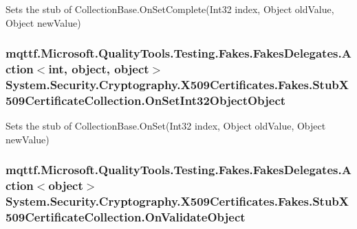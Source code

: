 Sets the stub of Collection\-Base.\-On\-Set\-Complete(\-Int32 index, Object old\-Value, Object new\-Value)

\hypertarget{class_system_1_1_security_1_1_cryptography_1_1_x509_certificates_1_1_fakes_1_1_stub_x509_certificate_collection_a7a2b38e975f09ab9f6a3968e4dedb807}{
\subsubsection[{On\-Set\-Int32\-Object\-Object}]{\setlength{\rightskip}{0pt plus 5cm}mqttf.\-Microsoft.\-Quality\-Tools.\-Testing.\-Fakes.\-Fakes\-Delegates.\-Action$<$int, object, object$>$ System.\-Security.\-Cryptography.\-X509\-Certificates.\-Fakes.\-Stub\-X509\-Certificate\-Collection.\-On\-Set\-Int32\-Object\-Object}}\label{class_system_1_1_security_1_1_cryptography_1_1_x509_certificates_1_1_fakes_1_1_stub_x509_certificate_collection_a7a2b38e975f09ab9f6a3968e4dedb807}


Sets the stub of Collection\-Base.\-On\-Set(\-Int32 index, Object old\-Value, Object new\-Value)

\hypertarget{class_system_1_1_security_1_1_cryptography_1_1_x509_certificates_1_1_fakes_1_1_stub_x509_certificate_collection_a9741764c7d589e19a953adef02123e79}{
\subsubsection[{On\-Validate\-Object}]{\setlength{\rightskip}{0pt plus 5cm}mqttf.\-Microsoft.\-Quality\-Tools.\-Testing.\-Fakes.\-Fakes\-Delegates.\-Action$<$object$>$ System.\-Security.\-Cryptography.\-X509\-Certificates.\-Fakes.\-Stub\-X509\-Certificate\-Collection.\-On\-Validate\-Object}}\label{class_system_1_1_security_1_1_cryptography_1_1_x509_certificates_1_1_fakes_1_1_stub_x509_certificate_collection_a9741764c7d589e19a953adef02123e79}


